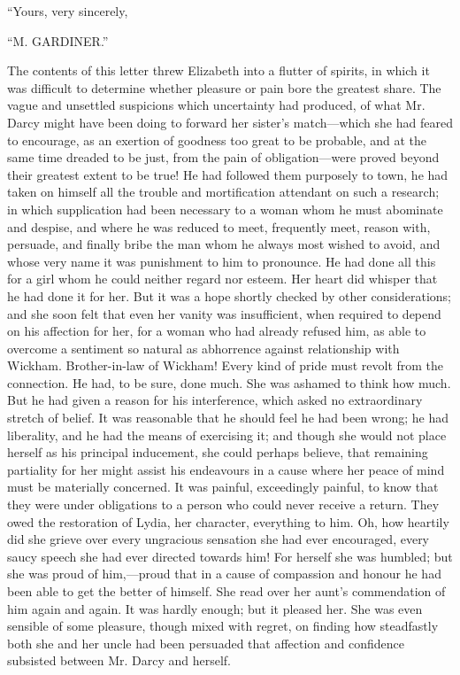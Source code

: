 \documentclass[12pt]{book}
\begin{document}
``Yours, very sincerely,

``M. GARDINER.''

The contents of this letter threw Elizabeth into a flutter of spirits, in which it was difficult to determine whether pleasure or pain bore the greatest share. The vague and unsettled suspicions which uncertainty had produced, of what Mr. Darcy might have been doing to forward her sister's match---which she had feared to encourage, as an exertion of goodness too great to be probable, and at the same time dreaded to be just, from the pain of obligation---were proved beyond their greatest extent to be true! He had followed them purposely to town, he had taken on himself all the trouble and mortification attendant on such a research; in which supplication had been necessary to a woman whom he must abominate and despise, and where he was reduced to meet, frequently meet, reason with, persuade, and finally bribe the man whom he always most wished to avoid, and whose very name it was punishment to him to pronounce. He had done all this for a girl whom he could neither regard nor esteem. Her heart did whisper that he had done it for her. But it was a hope shortly checked by other considerations; and she soon felt that even her vanity was insufficient, when required to depend on his affection for her, for a woman who had already refused him, as able to overcome a sentiment so natural as abhorrence against relationship with Wickham. Brother-in-law of Wickham! Every kind of pride must revolt from the connection. He had, to be sure, done much. She was ashamed to think how much. But he had given a reason for his interference, which asked no extraordinary stretch of belief. It was reasonable that he should feel he had been wrong; he had liberality, and he had the means of exercising it; and though she would not place herself as his principal inducement, she could perhaps believe, that remaining partiality for her might assist his endeavours in a cause where her peace of mind must be materially concerned. It was painful, exceedingly painful, to know that they were under obligations to a person who could never receive a return. They owed the restoration of Lydia, her character, everything to him. Oh, how heartily did she grieve over every ungracious sensation she had ever encouraged, every saucy speech she had ever directed towards him! For herself she was humbled; but she was proud of him,---proud that in a cause of compassion and honour he had been able to get the better of himself. She read over her aunt's commendation of him again and again. It was hardly enough; but it pleased her. She was even sensible of some pleasure, though mixed with regret, on finding how steadfastly both she and her uncle had been persuaded that affection and confidence subsisted between Mr. Darcy and herself.
\end{document}
